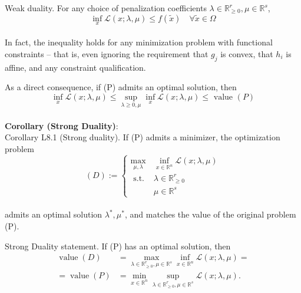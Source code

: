 \begin{theorem}[L8.2]{Weak duality.}
    For any choice of penalization coefficients $\lambda \in \mathbb{R}_{\geq 0}^r, \mu \in \mathbb{R}^s$,
    \vspace{-4pt}\\
    $$
    \inf _x \mathcal{L}(x ; \lambda, \mu) \leq f(\tilde{x}) \quad \forall \tilde{x} \in \Omega
    $$
    \vspace{-4pt}\\
    In fact, the inequality holds for any minimization problem with functional constraints -- that is, even ignoring the requirement that $g_j$ is convex, that $h_i$ is affine, and any constraint qualification.

    As a direct consequence, if (P) admits an optimal solution, then
    \vspace{-4pt}\\
    $$
    \inf _x \mathcal{L}(x ; \lambda, \mu) \leq \sup_{\lambda \geq 0, \mu}\inf _x \mathcal{L}(x ; \lambda, \mu) \leq \text { value }(P)
    $$
    \vspace{-4pt}\\
    \textbf{Corollary (Strong Duality)}:\\
    Corollary L8.1 (Strong duality). If (P) admits a minimizer, the optimization problem
    \vspace{-4pt}\\
    $$
    (D):= \begin{cases}\max _{\mu, \lambda} & \inf _{x \in \mathbb{R}^n} \mathcal{L}(x ; \lambda, \mu) \\ \text { s.t. } & \lambda \in \mathbb{R}_{\geq 0}^r \\ & \mu \in \mathbb{R}^s\end{cases}
    $$
    \vspace{-4pt}\\
    admits an optimal solution $\lambda^*, \mu^*$, and matches the value of the original problem (P).
\end{theorem}

\begin{remark}[L8.3]{Strong Duality statement.}
    If (P) has an optimal solution, then
    \vspace{-4pt}\\
    \begin{equation*}
        \begin{aligned}
            \operatorname{value}(D) &= \max _{\lambda \in \mathbb{R}_{\geq 0}^r, \mu \in \mathbb{R}^s} \inf _{x \in \mathbb{R}^n} \mathcal{L}(x ; \lambda, \mu) = \\
            =\operatorname{value}(P) &= {\min _{x \in \mathbb{R}^n} \sup _{\lambda \in \mathbb{R}_{\geq 0}^r, \mu \in \mathbb{R}_{ }^s} \mathcal{L}(x ; \lambda, \mu) .}
        \end{aligned}
    \end{equation*}
    \vspace{-4pt}
\end{remark}

